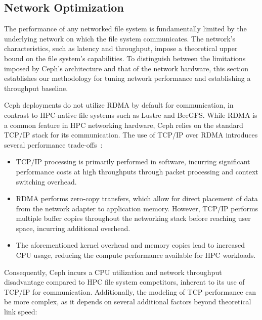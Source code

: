 \subsection{Network Optimization}

The performance of any networked file system is fundamentally limited by the underlying network on which the file system communicates. The network's characteristics, such as latency and throughput, impose a theoretical upper bound on the file system's capabilities. To distinguish between the limitations imposed by Ceph's architecture and that of the network hardware, this section establishes our methodology for tuning network performance and establishing a throughput baseline.

Ceph deployments do not utilize \ac{RDMA} by default for communication, in contrast to \acs{HPC}-native file systems such as Lustre and BeeGFS. While \ac{RDMA} is a common feature in \ac{HPC} networking hardware, Ceph relies on the standard \ac{TCP/IP} stack for its communication. The use of \ac{TCP/IP} over \ac{RDMA} introduces several performance trade-offs~\cite{linux_kernel_networking}:

\begin{itemize}
    \item \ac{TCP/IP} processing is primarily performed in software, incurring significant performance costs at high throughputs through packet processing and context switching overhead.
    \item \ac{RDMA} performs zero-copy transfers, which allow for direct placement of data from the network adapter to application memory. However, \ac{TCP/IP} performs multiple buffer copies throughout the networking stack before reaching user space, incurring additional overhead.
    \item The aforementioned kernel overhead and memory copies lead to increased \ac{CPU} usage, reducing the compute performance available for \ac{HPC} workloads.
\end{itemize}

Consequently, Ceph incurs a \ac{CPU} utilization and network throughput disadvantage compared to \ac{HPC} file system competitors, inherent to its use of \ac{TCP/IP} for communication. Additionally, the modeling of \ac{TCP} performance can be more complex, as it depends on several additional factors beyond theoretical link speed:

